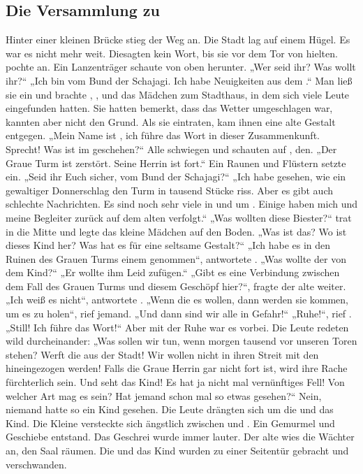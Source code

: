 \begin{huge}
\section{Die Versammlung zu \Lobarn}
Hinter einer kleinen Brücke stieg der Weg an. Die Stadt \Lobarn lag auf einem  Hügel. Es war es nicht mehr weit. Die\Schattenjager sagten kein Wort, bis sie vor dem Tor von \Lobarn hielten. \Eno pochte an.
Ein Lanzenträger schaute von oben herunter. 
„Wer seid ihr? Was wollt ihr?“
„Ich bin \Eno vom Bund der Schajagi. Ich habe Neuigkeiten aus dem \Enland.“ 
Man ließ sie ein und brachte \Eno, \Dolo, \Bomar und das Mädchen zum Stadthaus, in dem sich viele Leute eingefunden hatten. Sie hatten bemerkt, dass das Wetter umgeschlagen war, kannten aber nicht den Grund. Als sie eintraten, kam ihnen eine alte Gestalt entgegen. 
„Mein Name ist \Vester, ich führe das Wort in dieser Zusammenkunft. Sprecht! Was ist im \Enland geschehen?“
Alle schwiegen und schauten auf \Eno, den\Schattenjager.
„Der Graue Turm ist zerstört. Seine Herrin ist fort.“
Ein Raunen und Flüstern setzte ein.
„Seid ihr Euch sicher, \Eno vom Bund der Schajagi?“
„Ich habe gesehen, wie ein gewaltiger Donnerschlag den Turm in tausend Stücke riss. Aber es gibt auch schlechte Nachrichten. Es sind noch sehr viele \Bangiri in und um \Tern. Einige haben mich und meine Begleiter zurück auf dem alten  verfolgt.“
„Was wollten diese Biester?“
\Eno trat in die Mitte und legte das kleine Mädchen auf den Boden.
„Was ist das? Wo ist dieses Kind her? Was hat es für eine seltsame Gestalt?“
„Ich habe es in den Ruinen des Grauen Turms einem \Bangiri genommen“, antwortete \Eno.
„Was wollte der \Bangiri von dem Kind?“
„Er wollte ihm Leid zufügen.“
„Gibt es eine Verbindung zwischen dem Fall des Grauen Turms und diesem Geschöpf hier?“, fragte der alte \Vester weiter.
„Ich weiß es nicht“, antwortete \Eno.
„Wenn die \Bangiri es wollen, dann werden sie kommen, um es zu holen“, rief jemand. „Und dann sind wir alle in Gefahr!“
„Ruhe!“, rief \Vester. „Still! Ich führe das Wort!“
Aber mit der Ruhe war es vorbei. Die Leute redeten wild durcheinander: „Was sollen wir tun, wenn morgen tausend \Bangiri vor unseren Toren stehen? Werft die \Schattenjager aus der Stadt! Wir wollen nicht in ihren Streit mit den \Bangiri hineingezogen werden! Falls die Graue Herrin gar nicht fort ist, wird ihre Rache fürchterlich sein. Und seht das Kind! Es hat ja nicht mal vernünftiges Fell! Von welcher Art mag es sein? Hat jemand schon mal so etwas gesehen?“
Nein, niemand hatte so ein Kind gesehen. Die Leute drängten sich um die \Schattenjager und das Kind. Die Kleine versteckte sich ängstlich zwischen \Eno und \Bomar. Ein Gemurmel und Geschiebe entstand. Das Geschrei wurde immer lauter. Der alte \Vester wies die Wächter an, den Saal räumen. Die \Schattenjager und das Kind wurden zu einer Seitentür gebracht und verschwanden.


\end{huge}
